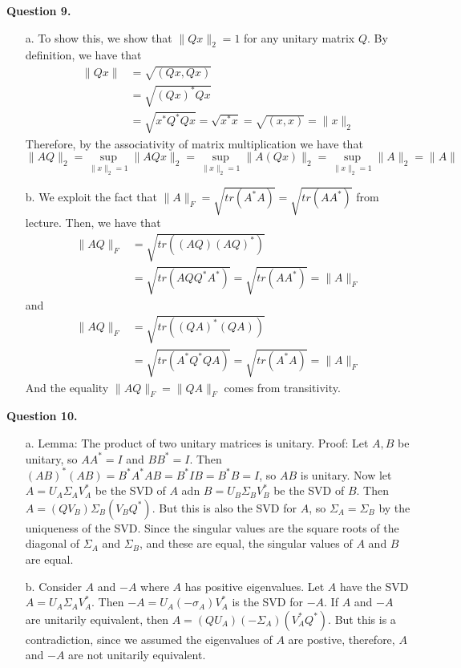 \documentclass{article}
\begin{document}
\textbf{Question 9.} \\
\begin{itemize}
    \item[a.] To show this, we show that $\|Qx\|_2=1$ for any unitary matrix $Q$. By definition, we have that 
    \begin{align*}
        \|Qx\| &= \sqrt{(Qx, Qx)}\\
        &= \sqrt{(Qx)^*Qx}\\
        &=\sqrt{x^*Q^*Qx}=\sqrt{x^*x}=\sqrt{(x, x)} = \|x\|_2
    \end{align*} 
    Therefore, by the associativity of matrix multiplication we have that 
    \begin{equation*}
        \|AQ\|_2 = \sup_{\|x\|_2=1}\|AQx\|_2 =\sup_{\|x\|_2=1}\|A(Qx)\|_2= \sup_{\|x\|_2=1}\|A\|_2 = \|A\|
    \end{equation*}
    \item[b.] We exploit the fact that $\|A\|_F = \sqrt{tr(A^*A)}=\sqrt{tr(AA^*)}$ from lecture. Then, we have that 
    \begin{align*}
        \|AQ\|_F &= \sqrt{tr((AQ)(AQ)^*)}\\
        &=\sqrt{tr(AQQ^*A^*)}=\sqrt{tr(AA^*)}=\|A\|_F
    \end{align*} 
    and 
    \begin{align*}
        \|AQ\|_F &= \sqrt{tr((QA)^*(QA))}\\
        &=\sqrt{tr(A^*Q^*QA)}= \sqrt{tr(A^*A)}=\|A\|_F
    \end{align*}
    And the equality $\|AQ\|_F = \|QA\|_F$ comes from transitivity. 
\end{itemize}

\textbf{Question 10.}
\begin{itemize}
    \item[a.] Lemma: The product of two unitary matrices is unitary. Proof: Let $A, B$ be unitary, so $AA^*=I$ and $BB^*=I$. Then $(AB)^*(AB) = B^*A^*AB = B^*IB = B^*B = I$, so $AB$ is unitary. Now let $A=U_A\Sigma_A V_A^*$ be the SVD of $A$ adn $B=U_B\Sigma_B V_B^*$ be the SVD of $B$. Then $A=(QV_B)\Sigma_B(V_BQ^*)$. But this is also the SVD for $A$, so $\Sigma_A = \Sigma_B$ by the uniqueness of the SVD. Since the singular values are the square roots of the diagonal of $\Sigma_A$ and $\Sigma_B$, and these are equal, the singular values of $A$ and $B$ are equal. 
    \item[b.] Consider $A$ and $-A$ where $A$ has positive eigenvalues. Let $A$ have the SVD $A=U_A\Sigma_A V^*_A$. Then $-A = U_A(-\sigma_A)V^*_A$ is the SVD for $-A$. If $A$ and $-A$ are unitarily equivalent, then $A=(QU_A)(-\Sigma_A)(V_A^*Q^*)$. But this is a contradiction, since we assumed the eigenvalues of $A$ are postive, therefore, $A$ and $-A$ are not unitarily equivalent.
\end{itemize}
\end{document}
